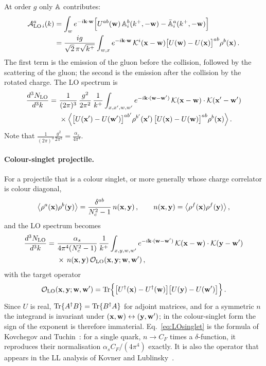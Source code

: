 At order $g$ only $\mathbb{A}$ contributes:
\begin{align}\label{eq:ALO}
\mathcal A^{a}_{{\rm LO}\,i}(k)&=\int_{w}e^{-i\mathbf{k}\cdot\mathbf{w}}\Big[U^{ab}(\mathbf{w})\,\mathbb{A}^b_i(k^+,-\mathbf{w})-\bar{\mathbb{A}}^a_i(k^+,-\mathbf{w})\Big]
\notag\\&=\frac{ig}{\sqrt2\,\pi\sqrt{k^+}}\int_{w,x}e^{-i\mathbf{k}\cdot\mathbf{w}}\,\mathcal{K}^i(\mathbf{x}-\mathbf{w})\big[U(\mathbf{w})-U(\mathbf{x})\big]^{ab}\rho^b(\mathbf{x})\,.
\end{align}
The first term is the emission of the gluon before the collision, followed by the scattering of the gluon; the second is the emission after the collision by the rotated charge. The LO spectrum is
\begin{align}\label{eq:LO}
\frac{d^3N_{\rm LO}}{d^3k}=\ &\frac{1}{(2\pi)^3}\,\frac{g^2}{2\pi^2}\,\frac{1}{k^+}\int_{x,x',w,w'}e^{-i\v k\cdot(\v w-\v w')}\,
\Kv(\v x-\v w)\cdot\Kv(\v x'-\v w')
\notag\\&\times
\Big\langle\big[U(\v x')-U(\v w')\big]^{ab'}\rho^{b'}(\v x')\,\big[U(\v x)-U(\v w)\big]^{ab}\rho^{b}(\v x)\Big\rangle\,.
\end{align}
Note that $\frac{1}{(2\pi)^3}\frac{g^2}{2\pi^2}=\frac{\alpha_s}{4\pi^4}$.

\paragraph{Colour-singlet projectile.} For a projectile that is a colour singlet, or more generally whose charge correlator is colour diagonal,
\begin{align}\label{eq:singlet}
\big\langle\rho^a(\mathbf{x})\rho^b(\mathbf{y})\big\rangle=\frac{\delta^{ab}}{N_c^2-1}\,n(\mathbf{x},\mathbf{y})\,,\qquad n(\mathbf{x},\mathbf{y})=\big\langle\rho^f(\mathbf{x})\rho^f(\mathbf{y})\big\rangle\,,
\end{align}
and the LO spectrum becomes
\begin{align}\label{eq:LOsinglet}
\frac{d^3N_{\rm LO}}{d^3k}=\ &\frac{\alpha_s}{4\pi^4(N_c^2-1)}\,\frac{1}{k^+}\int_{x,y,w,w'}e^{-i\v k\cdot(\v w-\v w')}\,\Kv(\v x-\v w)\cdot\Kv(\v y-\v w')
\notag\\&\times\,n(\v x,\v y)\,
\mathcal O_{\rm LO}(\v x,\v y;\v w,\v w')\,,
\end{align}
with the target operator
\begin{align}\label{eq:OLO}
\mathcal O_{\rm LO}(\mathbf{x},\mathbf{y};\mathbf{w},\mathbf{w}')={\rm Tr}\Big\{\big[U^\dagger(\mathbf{x})-U^\dagger(\mathbf{w})\big]\big[U(\mathbf{y})-U(\mathbf{w}')\big]\Big\}\,.
\end{align}
Since $U$ is real, ${\rm Tr}\{A^\dagger B\}={\rm Tr}\{B^\dagger A\}$ for adjoint matrices, and for a symmetric $n$ the integrand is invariant under $(\mathbf{x},\mathbf{w})\leftrightarrow(\mathbf{y},\mathbf{w}')$; in the colour-singlet form the sign of the exponent is therefore immaterial. Eq.~\eqref{eq:LOsinglet} is the formula of Kovchegov and Tuchin~\cite{Kovchegov:2001sc}: for a single quark, $n\to C_F$ times a $\delta$-function, it reproduces their normalisation $\alpha_sC_F/(4\pi^4)$ exactly. It is also the operator that appears in the LL analysis of Kovner and Lublinsky~\cite{Kovner:2006wr,Kovner:2006ge}.

